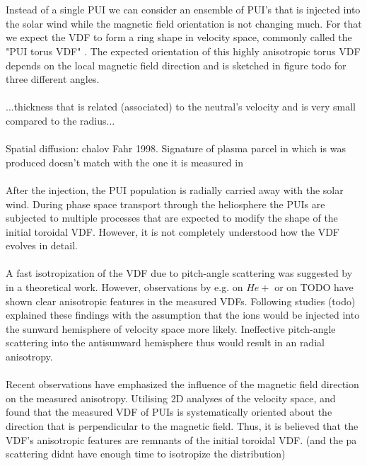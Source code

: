 \\ \\
Instead of a single PUI we can consider an ensemble of PUI's that is injected into the solar wind while the magnetic field orientation is not changing much. For that we expect the VDF to form a ring shape in velocity space, commonly called the "PUI torus VDF" \citep{oka_2002}.
The expected orientation of this highly anisotropic torus VDF depends on the local magnetic field direction and is sketched in figure todo for three different angles.
\\ \\
...thickness that is related (associated) to the neutral's velocity and is very small compared to the radius...\\ \\
Spatial diffusion: chalov Fahr 1998. Signature of plasma parcel in which is was produced doesn't match with the one it is measured in
\\ \\
After the injection, the PUI population is radially carried away with the solar wind. During phase space transport through the heliosphere the PUIs are subjected to multiple processes that are expected to modify the shape of the initial toroidal VDF. However, it is not completely understood how the VDF evolves in detail.
\\ \\
A fast isotropization of the VDF due to pitch-angle scattering was suggested by \citet{vasyl_siscoe_1976} in a theoretical work.
However, observations by e.g. \citet{moebius_98} on $He+$ or \citet{gloeckler_1995} on TODO have shown clear anisotropic features in the measured VDFs.
Following studies (todo) explained these findings with the assumption that the ions would be injected into the sunward hemisphere of velocity space more likely. Ineffective pitch-angle scattering into the antisunward hemisphere thus would result in an radial anisotropy.
\\ \\
Recent observations have emphasized the influence of the magnetic field direction on the measured anisotropy.
Utilising 2D analyses of the velocity space, \citet{oka_2002} and \citet{drews_2015} found that the measured VDF of PUIs is systematically oriented about the direction that is perpendicular to the magnetic field.
Thus, it is believed that the VDF's anisotropic features are remnants of the initial toroidal VDF. (and the pa scattering didnt have enough time to isotropize the distribution)
\\ \\
